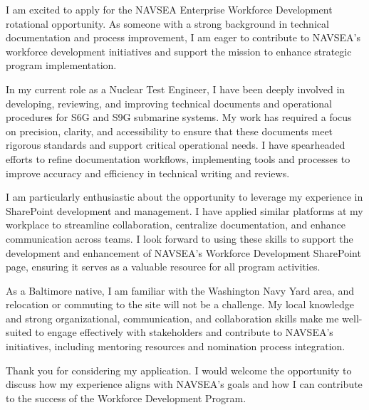 
I am excited to apply for the NAVSEA Enterprise Workforce Development rotational opportunity.
As someone with a strong background in technical documentation and process improvement, I am eager to contribute to NAVSEA's workforce development initiatives and support the mission to enhance strategic program implementation.

In my current role as a Nuclear Test Engineer, I have been deeply involved in developing, reviewing, and improving technical documents and operational procedures for S6G and S9G submarine systems.
My work has required a focus on precision, clarity, and accessibility to ensure that these documents meet rigorous standards and support critical operational needs.
I have spearheaded efforts to refine documentation workflows, implementing tools and processes to improve accuracy and efficiency in technical writing and reviews.

I am particularly enthusiastic about the opportunity to leverage my experience in SharePoint development and management.
I have applied similar platforms at my workplace to streamline collaboration, centralize documentation, and enhance communication across teams.
I look forward to using these skills to support the development and enhancement of NAVSEA's Workforce Development SharePoint page, ensuring it serves as a valuable resource for all program activities.

As a Baltimore native, I am familiar with the Washington Navy Yard area, and relocation or commuting to the site will not be a challenge.
My local knowledge and strong organizational, communication, and collaboration skills make me well-suited to engage effectively with stakeholders and contribute to NAVSEA's initiatives, including mentoring resources and nomination process integration.

Thank you for considering my application.
I would welcome the opportunity to discuss how my experience aligns with NAVSEA's goals and how I can contribute to the success of the Workforce Development Program.

